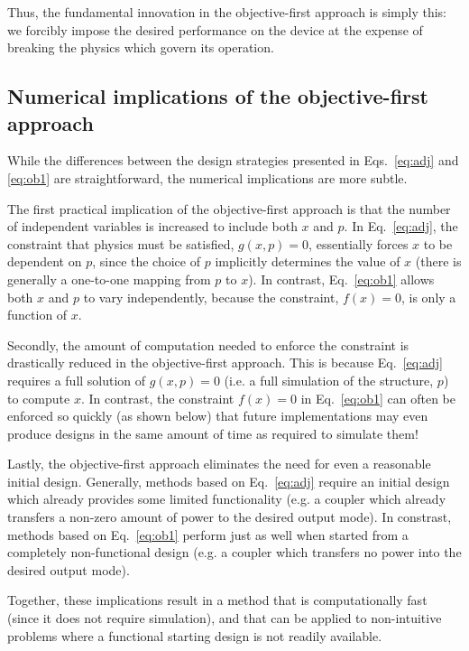 \documentclass[letterpaper,10pt]{article}
\begin{document}
Thus, the fundamental innovation in the objective-first approach
    is simply this:
    we forcibly impose the desired performance on the device at the expense of
    breaking the physics which govern its operation.

\subsection{Numerical implications of the objective-first approach}

While the differences between the design strategies presented in 
    Eqs.~\ref{eq:adj} and \ref{eq:ob1} are straightforward,
    the numerical implications are more subtle.

The first practical implication of the objective-first approach 
    is that the number of independent variables is increased to include
    both $x$ and $p$.
In Eq.~\ref{eq:adj}, the constraint that physics must be satisfied, $g(x,p)=0$, 
    essentially forces $x$ to be dependent on $p$,
    since the choice of $p$ implicitly determines the value of $x$
    (there is generally a one-to-one mapping from $p$ to $x$).
In contrast, Eq.~\ref{eq:ob1} allows both $x$ and $p$ to vary independently,
    because the constraint, $f(x)=0$, is only a function of $x$.

Secondly, the amount of computation needed to enforce the constraint is
    drastically reduced in the objective-first approach.
This is because Eq.~\ref{eq:adj} requires a full solution of $g(x,p)=0$
    (i.e. a full simulation of the structure, $p$) to compute $x$.
In contrast, the constraint $f(x)=0$ in Eq.~\ref{eq:ob1} 
    can often be enforced so quickly (as shown below) that 
    future implementations may even produce designs in the same amount of time
    as required to simulate them!

Lastly, the objective-first approach eliminates the need for even a reasonable
    initial design.
Generally, methods based on Eq.~\ref{eq:adj} require an initial design which
    already provides some limited functionality
    (e.g. a coupler which already transfers 
    a non-zero amount of power to the desired output mode).
In constrast, methods based on Eq.~\ref{eq:ob1} perform just as well
    when started from a completely non-functional design 
    (e.g. a coupler which transfers no power into the desired output mode).

Together, these implications result in a method
    that is computationally fast (since it does not require simulation), and
    that can be applied to non-intuitive problems 
    where a functional starting design is not readily available.
\end{document}
